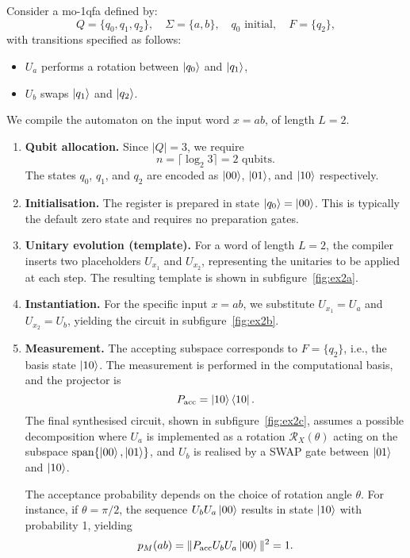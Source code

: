 \begin{example}[Two-Symbol Word of Length $L = 2$]
\label{ex:moqfa-two-symbols}
Consider a \gls{mo-1qfa} defined by:
\[
Q = \{q_0, q_1, q_2\}, \quad \Sigma = \{a, b\}, \quad q_0 \text{ initial}, \quad F = \{q_2\},
\]
with transitions specified as follows:
\begin{itemize}
  \item $U_a$ performs a rotation between $\ket{q_0}$ and $\ket{q_1}$,
  \item $U_b$ swaps $\ket{q_1}$ and $\ket{q_2}$.
\end{itemize}
We compile the automaton on the input word $x = ab$, of length $L = 2$.

\begin{enumerate}
  \item \textbf{Qubit allocation.} Since $|Q| = 3$, we require
  \[
  n = \lceil \log_2 3 \rceil = 2 \text{ qubits}.
  \]
  The states $q_0$, $q_1$, and $q_2$ are encoded as $\ket{00}$, $\ket{01}$, and $\ket{10}$ respectively.

  \item \textbf{Initialisation.} The register is prepared in state $\ket{q_0} = \ket{00}$. This is typically the default zero state and requires no preparation gates.

  \item \textbf{Unitary evolution (template).} For a word of length $L = 2$, the compiler inserts two placeholders $\boxed{U_{x_1}}$ and $\boxed{U_{x_2}}$, representing the unitaries to be applied at each step. The resulting template is shown in subfigure~\ref{fig:ex2a}.

  \item \textbf{Instantiation.} For the specific input $x = ab$, we substitute $U_{x_1} = U_a$ and $U_{x_2} = U_b$, yielding the circuit in subfigure~\ref{fig:ex2b}.

  \item \textbf{Measurement.} The accepting subspace corresponds to $F = \{q_2\}$, i.e., the basis state $\ket{10}$. The measurement is performed in the computational basis, and the projector is
  \[
  P_{\text{acc}} = \ket{10}\bra{10}.
  \]
  The final synthesised circuit, shown in subfigure~\ref{fig:ex2c}, assumes a possible decomposition where $U_a$ is implemented as a rotation $\mathcal{R}_X(\theta)$ acting on the subspace $\mathrm{span}\{\ket{00}, \ket{01}\}$, and $U_b$ is realised by a SWAP gate between $\ket{01}$ and $\ket{10}$.

  The acceptance probability depends on the choice of rotation angle $\theta$. For instance, if $\theta = \pi/2$, the sequence $U_b U_a \ket{00}$ results in state $\ket{10}$ with probability 1, yielding
  \[
  p_M(ab) = \|P_{\text{acc}} U_b U_a \ket{00}\|^2 = 1.
  \]
\end{enumerate}
\vspace{1em}
\begin{figure}[H]
\centering


\end{figure}
\end{example}
